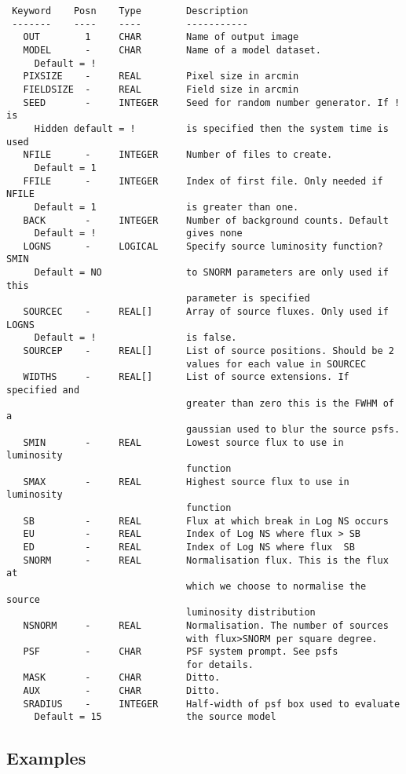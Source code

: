 \documentclass{book}
\renewcommand{\_}{{\tt\char'137}}     %
\begin{document}
\begin{verbatim}
 Keyword    Posn    Type        Description
 -------    ----    ----        -----------
   OUT        1     CHAR        Name of output image
   MODEL      -     CHAR        Name of a model dataset.
     Default = !
   PIXSIZE    -     REAL        Pixel size in arcmin
   FIELDSIZE  -     REAL        Field size in arcmin
   SEED       -     INTEGER     Seed for random number generator. If ! is
     Hidden default = !         is specified then the system time is used
   NFILE      -     INTEGER     Number of files to create.
     Default = 1
   FFILE      -     INTEGER     Index of first file. Only needed if NFILE
     Default = 1                is greater than one.
   BACK       -     INTEGER     Number of background counts. Default
     Default = !                gives none
   LOGNS      -     LOGICAL     Specify source luminosity function? SMIN
     Default = NO               to SNORM parameters are only used if this
                                parameter is specified
   SOURCEC    -     REAL[]      Array of source fluxes. Only used if LOGNS
     Default = !                is false.
   SOURCEP    -     REAL[]      List of source positions. Should be 2
                                values for each value in SOURCEC
   WIDTHS     -     REAL[]      List of source extensions. If specified and
                                greater than zero this is the FWHM of a
                                gaussian used to blur the source psfs.
   SMIN       -     REAL        Lowest source flux to use in luminosity
                                function
   SMAX       -     REAL        Highest source flux to use in luminosity
                                function
   SB         -     REAL        Flux at which break in Log NS occurs
   EU         -     REAL        Index of Log NS where flux > SB
   ED         -     REAL        Index of Log NS where flux  SB
   SNORM      -     REAL        Normalisation flux. This is the flux at
                                which we choose to normalise the source
                                luminosity distribution
   NSNORM     -     REAL        Normalisation. The number of sources
                                with flux>SNORM per square degree.
   PSF        -     CHAR        PSF system prompt. See psfs
                                for details.
   MASK       -     CHAR        Ditto.
   AUX        -     CHAR        Ditto.
   SRADIUS    -     INTEGER     Half-width of psf box used to evaluate
     Default = 15               the source model

\end{verbatim}\subsection{Examples}
\end{document}
